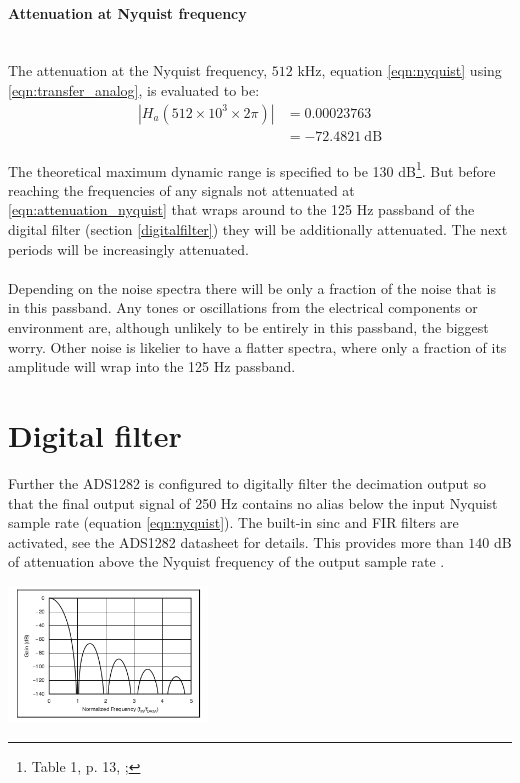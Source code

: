 \documentclass[a4paper]{article}
\begin{document}
\begin{multicols}{2}
\paragraph{Attenuation at Nyquist frequency}\ \\
The attenuation at the Nyquist
frequency, $512$ kHz, equation \eqref{eqn:nyquist} using
\eqref{eqn:transfer_analog}, is evaluated to be:
\begin{equation}
  \begin{aligned}
  | H_a(512 \times 10^3 \times 2 \pi) | &= 0.00023763 \\
                                        &= -72.4821\ \text{dB}
  \end{aligned}
  \label{eqn:attenuation_nyquist}
\end{equation}

The theoretical maximum dynamic range is specified to be 130
dB\footnote{Table 1, p. 13, \cite{ads1282_ds}; }.
But before reaching the frequencies of any signals not attenuated at
\eqref{eqn:attenuation_nyquist} that wraps around to the 125 Hz passband of
the digital filter (section \ref{digitalfilter}) they will be additionally
attenuated. The next periods will be increasingly attenuated.
\paragraph{} Depending on the noise spectra there will
be only a fraction of the noise that is in this passband. Any tones or
oscillations from the electrical components or environment are, although
unlikely to be entirely in this passband, the biggest worry. Other noise
is likelier to have a flatter spectra, where only a fraction of its
amplitude will wrap into the 125 Hz passband.


\label{digitalfilter}
\section{Digital filter}
\label{sec:digital_filter}
Further the ADS1282 is configured to digitally filter the decimation
output so that the final output signal of 250 Hz contains no alias below
the input Nyquist sample rate (equation \eqref{eqn:nyquist}). The
built-in sinc and FIR filters are activated, see the ADS1282 datasheet
\cite{ads1282_ds} for details. This provides more
than $140$ dB of attenuation above the Nyquist frequency of the output
sample rate \cite{ads1282_ds}.

\begin{center}
  \includegraphics[width=200px]{ads1282/sinc_filter.png}
\end{center}
\label{fig:ads1282_sinc_filter}


\end{multicols}
\end{document}
